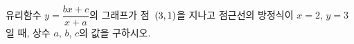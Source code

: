 유리함수 $y=\dfrac{bx+c}{x+a}$의 그래프가 점~$(3{,}\mkern3mu\mathopen{}1)$을 지나고 점근선의 방정식이 $x=2$, $y=3$일 때, 상수 $a$, $b$, $c$의 값을 구하시오.
